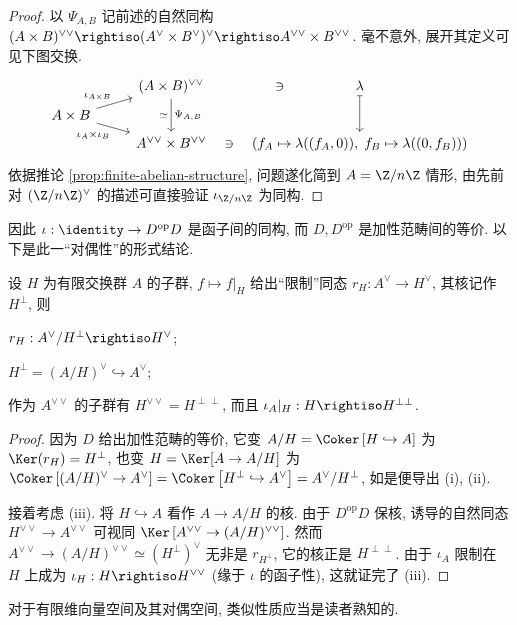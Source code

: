 \begin{proof}
	以 $\Psi_{A,B}$ 记前述的自然同构 $(A \times B)^{\vee\vee} \rightiso (A^\vee \times B^\vee)^\vee \rightiso A^{\vee\vee} \times B^{\vee\vee}$. 毫不意外, 展开其定义可见下图交换.
	\[\begin{tikzcd}[row sep=tiny]
		& (A \times B)^{\vee\vee} \arrow[dd, "\simeq"', "\Psi_{A,B}"] & \lambda \arrow[phantom, l, "\ni" description, sloped] \arrow[mapsto, dd] \\
		A \times B \arrow[ru, "{\iota_{A \times B}}"] \arrow[rd, "\iota_A \times \iota_B"'] & \\
		& A^{\vee\vee} \times B^{\vee\vee} & \arrow[phantom, l, "\ni" description, sloped] \left( f_A \mapsto \lambda((f_A, 0)), \; f_B \mapsto \lambda((0, f_B)) \right)
	\end{tikzcd}\]
	依据推论 \ref{prop:finite-abelian-structure}, 问题遂化简到 $A = \Z/n\Z$ 情形, 由先前对 $(\Z/n\Z)^\vee$ 的描述可直接验证 $\iota_{\Z/n\Z}$ 为同构.
\end{proof}
因此 $\iota: \identity \to D^\text{op} D$ 是函子间的同构, 而 $D, D^\text{op}$ 是加性范畴间的等价. 以下是此一``对偶性''的形式结论.

\begin{corollary}\label{prop:finite-duality-2}
	设 $H$ 为有限交换群 $A$ 的子群, $f \mapsto f|_H$ 给出``限制''同态 $r_H: A^\vee \to H^\vee$, 其核记作 $H^\perp$, 则
	\begin{compactenum}[(i)]
		\item $r_H: A^\vee/H^\perp \rightiso H^\vee$;
		\item $H^\perp = (A/H)^\vee \hookrightarrow A^\vee$;
		\item 作为 $A^{\vee\vee}$ 的子群有 $H^{\vee\vee} = H^{\perp\perp}$, 而且 $\iota_A|_H: H \rightiso H^{\perp\perp}$.
	\end{compactenum}
\end{corollary}
\begin{proof}
	因为 $D$ 给出加性范畴的等价, 它变 $A/H = \Coker\left[H \hookrightarrow A\right]$ 为 $\Ker(r_H) = H^\perp$, 也变 $H = \Ker[A \to A/H]$ 为 $\Coker\left[ (A/H)^\vee \to A^\vee \right] = \Coker\left[ H^\perp \hookrightarrow A^\vee \right] = A^\vee/H^\perp$, 如是便导出 (i), (ii).
	
	接着考虑 (iii). 将 $H \hookrightarrow A$ 看作 $A \to A/H$ 的核. 由于 $D^\text{op} D$ 保核, 诱导的自然同态 $H^{\vee\vee} \to A^{\vee\vee}$ 可视同 $\Ker\left[ A^{\vee\vee} \to (A/H)^{\vee\vee}\right]$. 然而 $A^{\vee\vee} \to (A/H)^{\vee\vee} \simeq (H^\perp)^\vee$ 无非是 $r_{H^\perp}$, 它的核正是 $H^{\perp\perp}$. 由于 $\iota_A$ 限制在 $H$ 上成为 $\iota_H: H \rightiso H^{\vee\vee}$ (缘于 $\iota$ 的函子性), 这就证完了 (iii).
\end{proof}
对于有限维向量空间及其对偶空间, 类似性质应当是读者熟知的.

